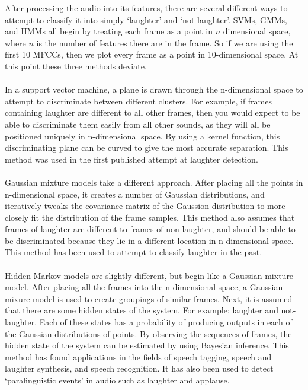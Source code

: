 \documentclass[a4paper,11pt,notitlepage]{article}
\begin{document}
After processing the audio into its features, there are several different ways to attempt to classify it into simply `laughter' and `not-laughter'. SVMs, GMMs, and HMMs all begin by treating each frame as a point in $n$ dimensional space, where $n$ is the number of features there are in the frame. So if we are using the first 10 MFCCs, then we plot every frame as a point in 10-dimensional space. At this point these three methods deviate.\\
\\
In a support vector machine, a plane is drawn through the n-dimensional space to attempt to discriminate between different clusters. For example, if frames containing laughter are different to all other frames, then you would expect to be able to discriminate them easily from all other sounds, as they will all be positioned uniquely in n-dimensional space. By using a kernel function, this discriminating plane can be curved to give the most accurate separation. This method was used in the first published attempt at laughter detection.\cite{kennedy2004laughter}\\
\\
Gaussian mixture models take a different approach. After placing all the points in n-dimensional space, it creates a number of Gaussian distributions, and iteratively tweaks the covariance matrix of the Gaussion distribution to more closely fit the distribution of the frame samples. This method also assumes that frames of laughter are different to frames of non-laughter, and should be able to be discriminated because they lie in a different location in n-dimensional space. This method has been used to attempt to classify laughter in the past.\cite{truong2005automatic}\\
\\
Hidden Markov models are slightly different, but begin like a Gaussian mixture model. After placing all the frames into the n-dimensional space, a Gaussian mixure model is used to create groupings of similar frames. Next, it is assumed that there are some hidden states of the system. For example: laughter and not-laughter. Each of these states has a probability of producing outputs in each of the Gaussian distributions of points. By observing the sequences of frames, the hidden state of the system can be estimated by using Bayesian inference. This method has found applications in the fields of speech tagging, speech and laughter synthesis\cite{dupont2014acoustic}, and speech recognition. It has also been used to detect `paralinguistic events' in audio such as laughter and applause.\cite{cai2003highlight}
\end{document}
